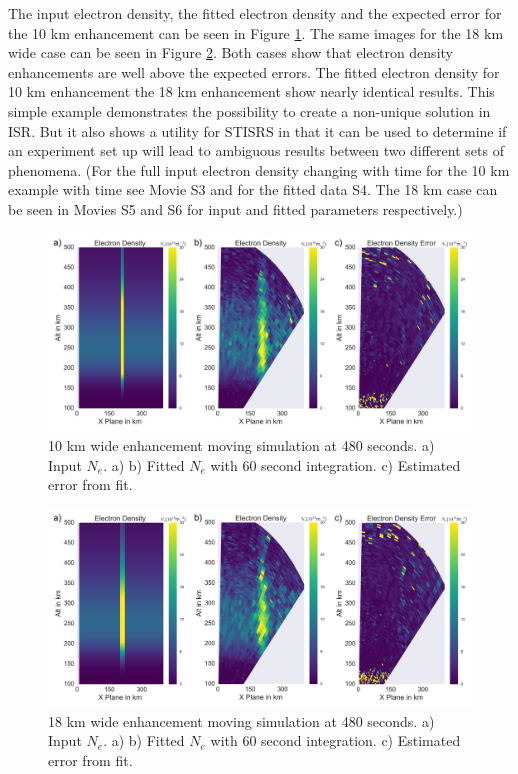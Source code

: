 \documentclass[draft,ras]{agutex}
\begin{document}
\begin{article}
The input electron density, the fitted electron density and the expected error for the 10 km enhancement can be seen in Figure \ref{fig:moving10all}. The same images for the 18 km wide case can be seen in Figure \ref{fig:moving18all}. Both cases show that electron density enhancements are well above the expected errors. The fitted electron density for 10 km enhancement the 18 km enhancement show nearly identical results. This simple example demonstrates the possibility to create a non-unique solution in ISR. But it also shows a utility for STISRS in that it can be used to determine if an experiment set up will lead to ambiguous results between two different sets of phenomena. (For the full input electron density changing with time for the 10 km example with time see Movie S3 and for the fitted data S4. The 18 km case can be seen in Movies S5 and S6 for input and fitted parameters respectively.)

\begin{figure}[!t]
\centering
\includegraphics[width=6in]{moving10kminouterr}
\caption{10 km wide enhancement moving simulation at 480 seconds. a) Input $N_e$. a)  b) Fitted $N_e$ with 60 second integration. c) Estimated error from fit.}
\label{fig:moving10all}
\end{figure}

\begin{figure}[!t]
\centering
\includegraphics[width=6in]{moving18kminouterr}
\caption{18 km wide enhancement moving simulation at 480 seconds. a) Input $N_e$. a)  b) Fitted $N_e$ with 60 second integration. c) Estimated error from fit.}
\label{fig:moving18all}
\end{figure}


\end{article}
\end{document}
